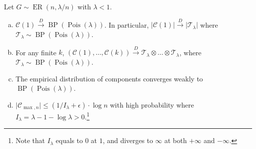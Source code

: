 \begin{lemma}\label{lma:component-of-subcritical-Erdős-Rényi-graph}
	Let \(G \sim \operatorname{ER}(n, \lambda / n) \) with \(\lambda < 1\).
	\begin{enumerate}[(a)]
		\item\label{lma:component-of-subcritical-Erdős-Rényi-graph-a}  \(\mathcal{C} (1) \overset{D}{\to} \operatorname{BP}(\operatorname{Pois}(\lambda ) ) \). In particular, \(\lvert \mathcal{C} (1) \rvert \overset{D}{\to} \lvert \mathcal{T} _\lambda  \rvert \) where \(\mathcal{T} _\lambda \sim \operatorname{BP}(\operatorname{Pois}(\lambda ) )\).
		\item\label{lma:component-of-subcritical-Erdős-Rényi-graph-b} For any finite \(k\), \((\mathcal{C} (1), \dots , \mathcal{C} (k)) \overset{D}{\to} \mathcal{T} _\lambda \otimes \dots \otimes \mathcal{T} _\lambda \), where \(\mathcal{T} _\lambda \sim \operatorname{BP}(\operatorname{Pois}(\lambda ) )\).
		\item\label{lma:component-of-subcritical-Erdős-Rényi-graph-c} The empirical distribution of components converges weakly to \(\operatorname{BP}(\operatorname{Pois}(\lambda ) ) \).
		\item\label{lma:component-of-subcritical-Erdős-Rényi-graph-d} \(\lvert \mathcal{C} _{\max , n} \rvert \leq (1 / I_\lambda + \epsilon ) \cdot \log n\) with high probability where \(I_\lambda = \lambda - 1 - \log \lambda > 0\).\footnote{Note that \(I_\lambda \) equals to \(0\) at \(1\), and diverges to \(\infty \) at both \(+\infty \) and \(-\infty \).}
	\end{enumerate}
\end{lemma}
